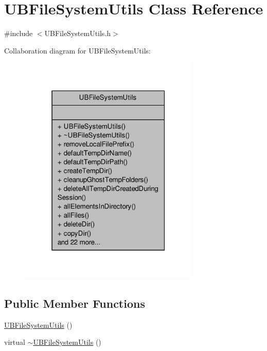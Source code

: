 \hypertarget{class_u_b_file_system_utils}{\section{U\-B\-File\-System\-Utils Class Reference}
\label{d2/d7a/class_u_b_file_system_utils}
}


{\ttfamily \#include $<$U\-B\-File\-System\-Utils.\-h$>$}



Collaboration diagram for U\-B\-File\-System\-Utils\-:
\nopagebreak
\begin{figure}[H]
\begin{center}
\leavevmode
\includegraphics[width=244pt]{da/d8a/class_u_b_file_system_utils__coll__graph}
\end{center}
\end{figure}
\subsection*{Public Member Functions}
\begin{DoxyCompactItemize}
\item 
\hyperlink{class_u_b_file_system_utils_a9a71530a67f2171738be6ef6b155f19c}{U\-B\-File\-System\-Utils} ()
\item 
virtual \hyperlink{class_u_b_file_system_utils_aedc2f5f3de89c1f06be1dde7bd2b50dd}{$\sim$\-U\-B\-File\-System\-Utils} ()
\end{DoxyCompactItemize}
